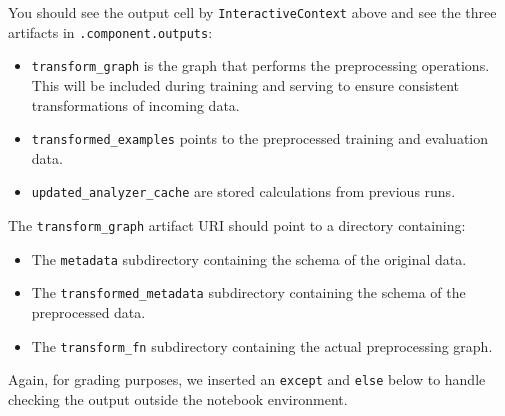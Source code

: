 \documentclass[11pt]{article}
\providecommand{\tightlist}{%
      \setlength{\itemsep}{0pt}\setlength{\parskip}{0pt}}
\begin{document}
    You should see the output cell by \texttt{InteractiveContext} above and
see the three artifacts in \texttt{.component.outputs}:

\begin{itemize}
\tightlist
\item
  \texttt{transform\_graph} is the graph that performs the preprocessing
  operations. This will be included during training and serving to
  ensure consistent transformations of incoming data.
\item
  \texttt{transformed\_examples} points to the preprocessed training and
  evaluation data.
\item
  \texttt{updated\_analyzer\_cache} are stored calculations from
  previous runs.
\end{itemize}

    The \texttt{transform\_graph} artifact URI should point to a directory
containing:

\begin{itemize}
\tightlist
\item
  The \texttt{metadata} subdirectory containing the schema of the
  original data.
\item
  The \texttt{transformed\_metadata} subdirectory containing the schema
  of the preprocessed data.
\item
  The \texttt{transform\_fn} subdirectory containing the actual
  preprocessing graph.
\end{itemize}

Again, for grading purposes, we inserted an \texttt{except} and
\texttt{else} below to handle checking the output outside the notebook
environment.
\end{document}
